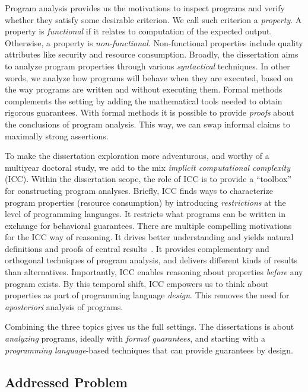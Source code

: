 Program analysis provides us the motivations to inspect programs and verify whether they satisfy some desirable criterion.
We call such criterion a \emph{property}.
A property is \emph{functional} if it relates to computation of the expected output.
Otherwise, a property is \emph{non-functional}.
Non-functional properties include quality attributes like security and resource consumption.
Broadly, the dissertation aims to analyze program properties through various \emph{syntactical} techniques.
In other words, we analyze how programs will behave when they are executed, based on the way programs are written and without executing them.
Formal methods complements the setting by adding the mathematical tools needed to obtain rigorous guarantees.
With formal methods it is possible to provide \emph{proofs} about the conclusions of program analysis.
This way, we can swap informal claims to maximally strong assertions.

To make the dissertation exploration more adventurous, and worthy of a multiyear doctoral study, we add
to the mix \emph{implicit computational complexity} (ICC).
Within the dissertation scope, the role of ICC is to provide a \enquote{toolbox} for constructing program analyses.
Briefly, ICC finds ways to characterize program properties (resource consumption) by introducing \emph{restrictions} at the level of programming languages.
It restricts what programs can be written in exchange for behavioral guarantees.
There are multiple compelling motivations for the ICC way of reasoning.
It drives better understanding and yields natural definitions and proofs of central results~\cite{kristiansen2017}.
It provides complementary and orthogonal techniques of program analysis, and delivers different kinds of results than alternatives.
Importantly, ICC enables reasoning about properties \emph{before} any program exists.
By this temporal shift, ICC empowers us to think about properties as part of programming language \emph{design}.
This removes the need for \emph{aposteriori} analysis of programs.

Combining the three topics gives us the full settings.
The dissertations is about \emph{analyzing} programs, ideally with \emph{formal guarantees}, and starting with a \emph{programming language}-based techniques that can provide guarantees by design.

\subsection{Addressed Problem}
\label{subsec:problem}

